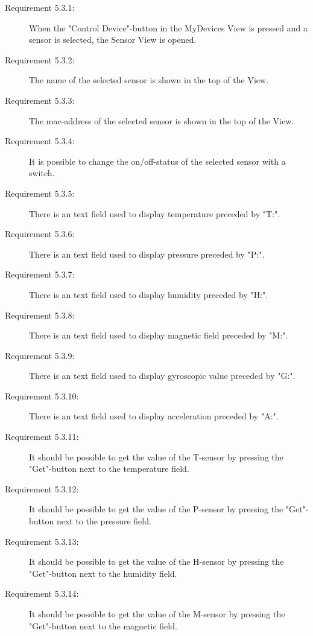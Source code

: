 \documentclass[a4paper]{article}
\begin{document}
\begin{description}
\item[Requirement 5.3.1:] When the "Control Device"-button in the MyDevices View is pressed and a sensor is selected, the Sensor View is opened. 

\item[Requirement 5.3.2:] The name of the selected sensor is shown in the top of the View.

\item[Requirement 5.3.3:] The mac-address of the selected sensor is shown in the top of the View.

\item[Requirement 5.3.4:] It is possible to change the on/off-status of the selected sensor with a switch.

\item[Requirement 5.3.5:] There is an text field used to display temperature preceded by "T:".

\item[Requirement 5.3.6:] There is an text field used to display pressure preceded by "P:".

\item[Requirement 5.3.7:] There is an text field used to display humidity preceded by "H:".

\item[Requirement 5.3.8:] There is an text field used to display magnetic field preceded by "M:".

\item[Requirement 5.3.9:] There is an text field used to display gyroscopic value preceded by "G:".

\item[Requirement 5.3.10:] There is an text field used to display acceleration preceded by "A:".

\item[Requirement 5.3.11:] It should be possible to get the value of the T-sensor by pressing the "Get"-button next to the temperature field.

\item[Requirement 5.3.12:] It should be possible to get the value of the P-sensor by pressing the "Get"-button next to the pressure field.

\item[Requirement 5.3.13:] It should be possible to get the value of the H-sensor by pressing the "Get"-button next to the humidity field.

\item[Requirement 5.3.14:] It should be possible to get the value of the M-sensor by pressing the "Get"-button next to the magnetic field.


\end{description}
\end{document}
